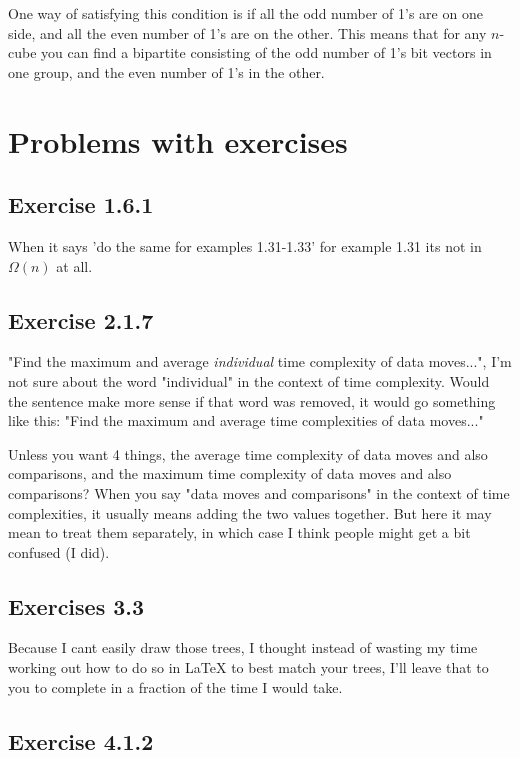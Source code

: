 \documentclass{article}
\begin{document}
One way of satisfying this condition is if all the odd number of 1's are on one side, and all the even number of 1's are on the other. This means that for any \(n\)-cube you can find a bipartite consisting of the odd number of 1's bit vectors in one group, and the even number of 1's in the other.



\section{Problems with exercises}

\subsection*{Exercise 1.6.1}

When it says 'do the same for examples 1.31-1.33' for example 1.31 its not in \( \Omega(n)\) at all. 

\subsection*{Exercise 2.1.7}

"Find the maximum and average \textit{individual} time complexity of data moves...", I'm not sure about the word "individual" in the context of time complexity. Would the sentence make more sense if that word was removed, it would go something like this:
"Find the maximum and average time complexities of data moves..."

Unless you want 4 things, the average time complexity of data moves and also comparisons, and the maximum time complexity of data moves and also comparisons? When you say "data moves and comparisons" in the context of time complexities, it usually means adding the two values together. But here it may mean to treat them separately, in which case I think people might get a bit confused (I did).

\subsection*{Exercises 3.3}

Because I cant easily draw those trees, I thought instead of wasting my time working out how to do so in LaTeX to best match your trees, I'll leave that to you to complete in a fraction of the time I would take.

\subsection*{Exercise 4.1.2}
\end{document}
